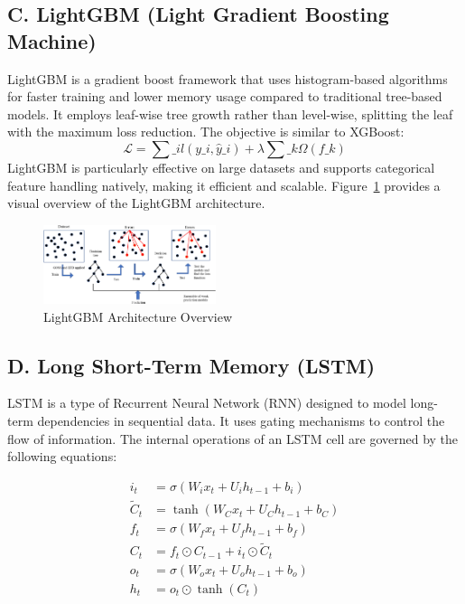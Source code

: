 \documentclass[final,numbered]{ifacconf}
\begin{document}
\subsection{C. LightGBM (Light Gradient Boosting Machine)}
LightGBM is a gradient boost framework that uses histogram-based algorithms for faster training and lower memory usage compared to traditional tree-based models. It employs leaf-wise tree growth rather than level-wise, splitting the leaf with the maximum loss reduction. The objective is similar to XGBoost\cite{ke2017lightgbm}:
\begin{equation}
\mathcal{L} = \sum\_{i} l(y\_i, \hat{y}\_i) + \lambda \sum\_k \Omega(f\_k)
\end{equation}
LightGBM is particularly effective on large datasets and supports categorical feature handling natively, making it efficient and scalable.
Figure~\ref{fig:lightgmb} provides a visual overview of the LightGBM architecture.
\begin{figure}[h]
  \centering
  \includegraphics[width=0.45\textwidth]{lightgmb.png}
  \caption{LightGBM Architecture Overview \cite{Deborah2024}}
  \label{fig:lightgmb}
\end{figure}

\subsection{D. Long Short-Term Memory (LSTM)}

LSTM is a type of Recurrent Neural Network (RNN) designed to model long-term dependencies in sequential data. It uses gating mechanisms to control the flow of information. The internal operations of an LSTM cell are governed by the following equations:

\begin{align}
i_t &= \sigma(W_i x_t + U_i h_{t-1} + b_i) \\
\tilde{C}_t &= \tanh(W_C x_t + U_C h_{t-1} + b_C) \\
f_t &= \sigma(W_f x_t + U_f h_{t-1} + b_f) \\
C_t &= f_t \odot C_{t-1} + i_t \odot \tilde{C}_t \\
o_t &= \sigma(W_o x_t + U_o h_{t-1} + b_o) \\
h_t &= o_t \odot \tanh(C_t)
\end{align}
\end{document}

